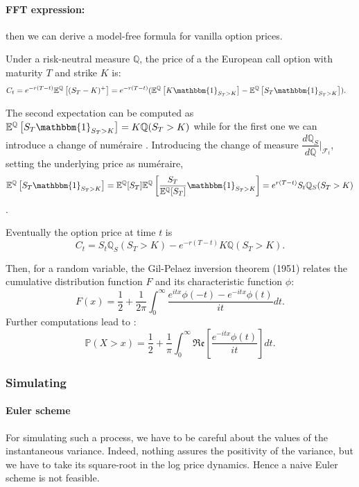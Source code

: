 \paragraph{FFT expression:} then we can derive a model-free formula for vanilla option prices.

Under a risk-neutral measure $\mathbb{Q}$, the price of a the European call option with maturity $T$ and strike $K$ is:
\begin{align*}
    C_t = e^{-r(T-t)} \mathbb{E}^{\mathbb{Q}}\left[(S_T - K)^{+}\right]
    &= e^{-r(T-t)} (\mathbb{E}^{\mathbb{Q}}\left[K \mathbbm{1}_{S_T > K}\right] - \mathbb{E}^{\mathbb{Q}}\left[S_T \mathbbm{1}_{S_T > K}\right]).
\end{align*}

The second expectation can be computed as $\mathbb{E}^{\mathbb{Q}}\left[S_T \mathbbm{1}_{S_T > K}\right] = K\mathbb{Q}(S_T>K)$ while for the first one we can introduce a change of num\'eraire \cite{el1995changes}. Introducing the change of measure $\dfrac{d\mathbb{Q}_S}{d\mathbb{Q}} \Big|_{\mathcal{F}_t}$, setting the underlying price as num\'eraire, \[\mathbb{E}^{\mathbb{Q}}\left[S_T \mathbbm{1}_{S_T > K}\right] = \mathbb{E}^{\mathbb{Q}}[S_T] \mathbb{E}^{\mathbb{Q}}\left[\dfrac{S_T}{\mathbb{E}^{\mathbb{Q}}[S_T]} \mathbbm{1}_{S_T > K}\right] = e^{r(T-t)}S_t \mathbb{Q}_S(S_T>K)\].

Eventually the option price at time $t$ is \[C_t = S_t \mathbb{Q}_S(S_T>K) - e^{-r(T-t)}K\mathbb{Q}(S_T>K).\]

Then, for a random variable, the Gil-Pelaez inversion theorem (1951) relates the cumulative distribution function $F$ and its characteristic function $\phi$: \[F(x) = \frac1{2} + \frac1{2\pi} \int_0^\infty \dfrac{e^{itx}\phi(-t) - e^{-itx}\phi(t)}{it} dt.\]
Further computations lead to \cite{shephard1991characteristic}:
\[\mathbb{P}(X > x) = \frac1{2} + \frac1{\pi} \int_0^\infty \mathfrak{Re}\left[ \dfrac{e^{-itx}\phi(t)}{it} \right] dt.\]

\subsubsection*{Simulating}

\paragraph{Euler scheme}
For simulating such a process, we have to be careful about the values of the instantaneous variance. Indeed, nothing assures the positivity of the variance, but we have to take its square-root in the log price dynamics. Hence a naive Euler scheme is not feasible.

